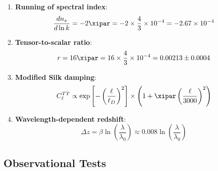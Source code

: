 	\begin{enumerate}
		\item \textbf{Running of spectral index}:
		\begin{equation}
			\frac{dn_s}{d\ln k} = -2\xipar = -2 \times \frac{4}{3} \times 10^{-4} = -2.67 \times 10^{-4}
		\end{equation}
		
		\item \textbf{Tensor-to-scalar ratio}:
		\begin{equation}
			r = 16\xipar = 16 \times \frac{4}{3} \times 10^{-4} = 0.00213 \pm 0.0004
		\end{equation}
		
		\item \textbf{Modified Silk damping}:
		\begin{equation}
			C_\ell^{TT} \propto \exp\left[-\left(\frac{\ell}{\ell_D}\right)^2\right] \times \left(1 + \xipar \left(\frac{\ell}{3000}\right)^2\right)
		\end{equation}
		
		\item \textbf{Wavelength-dependent redshift}:
		\begin{equation}
			\Delta z = \beta \ln\left(\frac{\lambda}{\lambda_0}\right) \approx 0.008 \ln\left(\frac{\lambda}{\lambda_0}\right)
		\end{equation}
	\end{enumerate}
	
	\subsection{Observational Tests}
	
	\begin{table}[htbp]
		\centering
		\caption{T0 Predictions vs Observations}
	\end{table}
	
